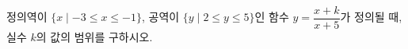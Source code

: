 \hspace*{2mm}\begin{minipage}[t]{\dimexpr\linewidth-2mm\relax}\vspace{0pt}
정의역이 $\{x \mid -3\le x\le -1\}$, 공역이 $\{y \mid 2\le y\le 5\}$인 함수 $y=\dfrac{x+k}{x+5}$가 정의될 때, 실수 $k$의 값의 범위를 구하시오.\end{minipage}
